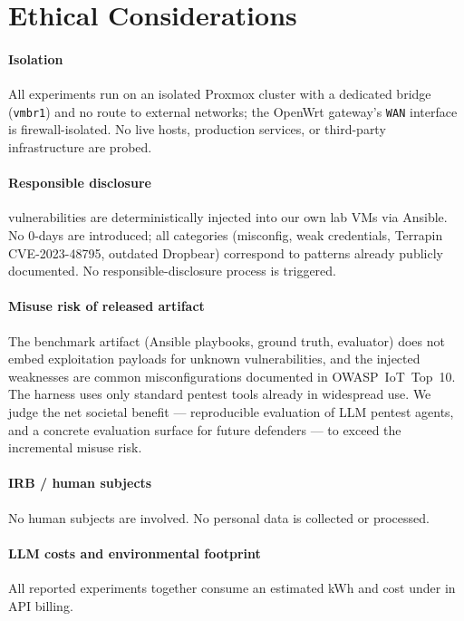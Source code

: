 
\section{Ethical Considerations}
\label{sec:ethical}

\paragraph{Isolation}
All experiments run on an isolated Proxmox cluster with a dedicated bridge
(\texttt{vmbr1}) and no route to external networks; the OpenWrt gateway's
\texttt{WAN} interface is firewall-isolated. No live hosts, production
services, or third-party infrastructure are probed.

\paragraph{Responsible disclosure}
\systemname{} vulnerabilities are deterministically injected into our own
lab VMs via Ansible. No 0-days are introduced; all categories (misconfig,
weak credentials, Terrapin CVE-2023-48795, outdated Dropbear) correspond to
patterns already publicly documented. No responsible-disclosure process is
triggered.

\paragraph{Misuse risk of released artifact}
The benchmark artifact (Ansible playbooks, ground truth, evaluator) does not
embed exploitation payloads for unknown vulnerabilities, and the injected
weaknesses are common misconfigurations documented in OWASP~IoT~Top~10.
The harness uses only standard pentest tools already in widespread use.
We judge the net societal benefit — reproducible evaluation of LLM pentest
agents, and a concrete evaluation surface for future defenders — to exceed
the incremental misuse risk.

\paragraph{IRB / human subjects}
No human subjects are involved. No personal data is collected or processed.

\paragraph{LLM costs and environmental footprint}
All reported experiments together consume an estimated  kWh and
cost under  in API billing.
